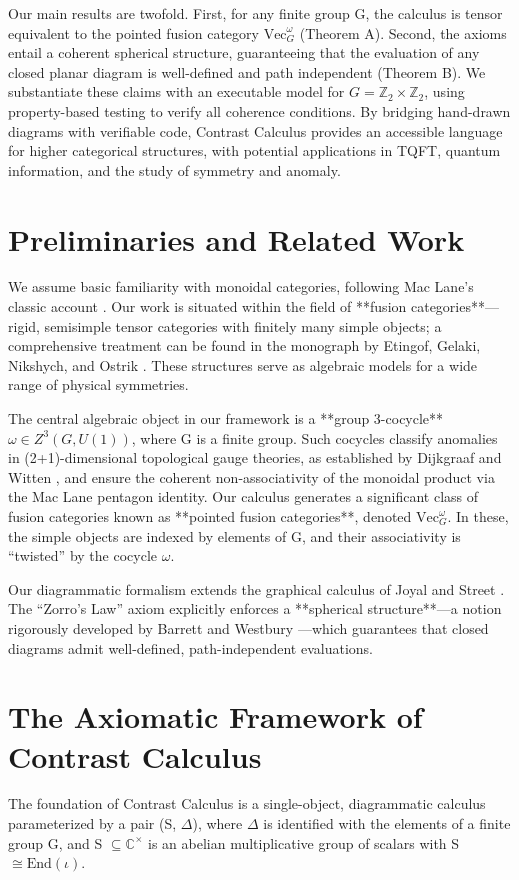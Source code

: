 \documentclass[11pt]{article}
\theoremstyle{definition}
\theoremstyle{remark}
\newcommand{\iotaunit}{\iota}
\newcommand{\C}{\mathbb{C}}
\begin{document}
Our main results are twofold. First, for any finite group G, the calculus is tensor equivalent to the pointed fusion category $\mathrm{Vec}_G^\omega$ (Theorem A). Second, the axioms entail a coherent spherical structure, guaranteeing that the evaluation of any closed planar diagram is well-defined and path independent (Theorem B). We substantiate these claims with an executable model for $G=\mathbb{Z}_2 \times \mathbb{Z}_2$, using property-based testing to verify all coherence conditions. By bridging hand-drawn diagrams with verifiable code, Contrast Calculus provides an accessible language for higher categorical structures, with potential applications in TQFT, quantum information, and the study of symmetry and anomaly.

\section{Preliminaries and Related Work}
We assume basic familiarity with monoidal categories, following Mac Lane’s classic account \cite{MacLane1998}. Our work is situated within the field of **fusion categories**—rigid, semisimple tensor categories with finitely many simple objects; a comprehensive treatment can be found in the monograph by Etingof, Gelaki, Nikshych, and Ostrik \cite{EGNO2015}. These structures serve as algebraic models for a wide range of physical symmetries.

The central algebraic object in our framework is a **group 3-cocycle** $\omega \in Z^3(G, U(1))$, where G is a finite group. Such cocycles classify anomalies in (2+1)-dimensional topological gauge theories, as established by Dijkgraaf and Witten \cite{DijkgraafWitten1990}, and ensure the coherent non-associativity of the monoidal product via the Mac Lane pentagon identity. Our calculus generates a significant class of fusion categories known as **pointed fusion categories**, denoted $\mathrm{Vec}_G^\omega$. In these, the simple objects are indexed by elements of G, and their associativity is “twisted” by the cocycle $\omega$.

Our diagrammatic formalism extends the graphical calculus of Joyal and Street \cite{JoyalStreet1993}. The “Zorro’s Law” axiom explicitly enforces a **spherical structure**—a notion rigorously developed by Barrett and Westbury \cite{BarrettWestbury1999}—which guarantees that closed diagrams admit well-defined, path-independent evaluations.

\section{The Axiomatic Framework of Contrast Calculus}
The foundation of Contrast Calculus is a single-object, diagrammatic calculus parameterized by a pair (S, $\Delta$), where $\Delta$ is identified with the elements of a finite group G, and S $\subseteq \C^\times$ is an abelian multiplicative group of scalars with S $\cong \mathrm{End}(\iotaunit)$.
\end{document}
